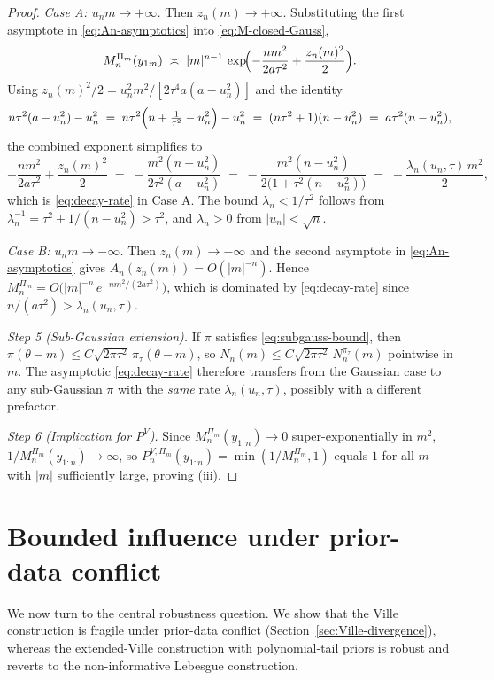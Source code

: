 \documentclass[numsec,webpdf,modern,medium,namedate]{oup-authoring-template}
\theoremstyle{thmstyleone}%
\theoremstyle{thmstyletwo}%
\theoremstyle{thmstylethree}%
\newcommand{\1}{\mathbf{1}}
\begin{document}
\begin{proof}
\emph{Case A: $u_{n}m\to+\infty$.} Then $z_{n}(m)\to+\infty$. Substituting the first asymptote in \eqref{eq:An-asymptotics} into \eqref{eq:M-closed-Gauss},
\[
   M_{n}^{\Pi_{m}}(y_{1:n})\;\asymp\;|m|^{n-1}\,\exp\!\Bigl(-\frac{nm^{2}}{2a\tau^{2}}+\frac{z_{n}(m)^{2}}{2}\Bigr).
\]
Using $z_{n}(m)^{2}/2=u_{n}^{2}m^{2}/[2\tau^{4}a(a-u_{n}^{2})]$ and the identity
\[
   n\tau^{2}(a-u_{n}^{2})-u_{n}^{2}
   \;=\; n\tau^{2}\Bigl(n+\tfrac{1}{\tau^{2}}-u_{n}^{2}\Bigr)-u_{n}^{2}
   \;=\; (n\tau^{2}+1)(n-u_{n}^{2})
   \;=\; a\tau^{2}(n-u_{n}^{2}),
\]
the combined exponent simplifies to
\[
   -\frac{nm^{2}}{2a\tau^{2}}+\frac{z_{n}(m)^{2}}{2}
   \;=\; -\frac{m^{2}(n-u_{n}^{2})}{2\tau^{2}(a-u_{n}^{2})}
   \;=\; -\frac{m^{2}(n-u_{n}^{2})}{2\bigl(1+\tau^{2}(n-u_{n}^{2})\bigr)}
   \;=\; -\frac{\lambda_{n}(u_{n},\tau)\,m^{2}}{2},
\]
which is \eqref{eq:decay-rate} in Case A. The bound $\lambda_{n}<1/\tau^{2}$ follows from $\lambda_{n}^{-1}=\tau^{2}+1/(n-u_{n}^{2})>\tau^{2}$, and $\lambda_{n}>0$ from $|u_{n}|<\sqrt n$.

\emph{Case B: $u_{n}m\to-\infty$.} Then $z_{n}(m)\to-\infty$ and the second asymptote in \eqref{eq:An-asymptotics} gives $A_{n}(z_{n}(m))=O(|m|^{-n})$. Hence $M_{n}^{\Pi_{m}}=O\bigl(|m|^{-n}\,e^{-nm^{2}/(2a\tau^{2})}\bigr)$, which is dominated by \eqref{eq:decay-rate} since $n/(a\tau^{2})>\lambda_{n}(u_{n},\tau)$.
 
\emph{Step 5 (Sub-Gaussian extension).} If $\pi$ satisfies \eqref{eq:subgauss-bound}, then $\pi(\theta-m)\le C\sqrt{2\pi\tau^{2}}\,\pi_{\tau}(\theta-m)$, so $N_{n}(m)\le C\sqrt{2\pi\tau^{2}}\,N_{n}^{\pi_{\tau}}(m)$ pointwise in $m$. The asymptotic \eqref{eq:decay-rate} therefore transfers from the Gaussian case to any sub-Gaussian $\pi$ with the \emph{same} rate $\lambda_{n}(u_{n},\tau)$, possibly with a different prefactor.
 
\emph{Step 6 (Implication for $P^{V}$).} Since $M_{n}^{\Pi_{m}}(y_{1:n})\to 0$ super-exponentially in $m^{2}$, $1/M_{n}^{\Pi_{m}}(y_{1:n})\to\infty$, so $P_{n}^{V,\Pi_{m}}(y_{1:n})=\min(1/M_{n}^{\Pi_{m}},1)$ equals $1$ for all $m$ with $|m|$ sufficiently large, proving (iii).

\end{proof}


\section{Bounded influence under prior-data conflict}\label{sec:bdd-influence}
We now turn to the central robustness question. We show that the Ville construction is fragile under prior-data conflict (Section~\ref{sec:Ville-divergence}), whereas the extended-Ville
construction with polynomial-tail priors is robust and reverts to the non-informative Lebesgue construction.
\end{document}
